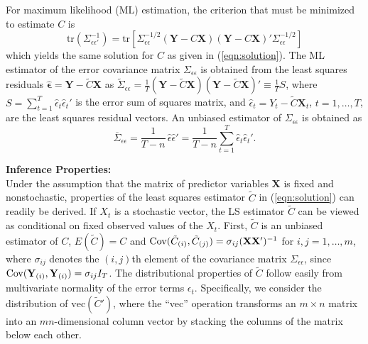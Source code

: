 For maximum likelihood (ML) estimation, the criterion that must be minimized to estimate $C$ is 
	\begin{equation}\label{eqn:mintrace}
	\text{tr}\left(\Sigma^{-1}_{\epsilon\epsilon'}\right)=\text{tr}\left[ \Sigma_{\epsilon\epsilon}^{-1/2} (\mathbf{Y}-C\mathbf{X})(\mathbf{Y}-C\mathbf{X})' \Sigma_{\epsilon\epsilon}^{-1/2}\right]
	\end{equation}
which yields the same solution for $C$ as given in (\ref{eqn:solution}). The ML estimator of the error covariance matrix $\Sigma_{\epsilon\epsilon}$ is obtained from the least squares residuals $\hat{\mathbf{\epsilon}}=\mathbf{Y}- \tilde{C} \mathbf{X}$ as $\tilde{\Sigma}_{\epsilon\epsilon}= \frac{1}{T}(\mathbf{Y}-\tilde{C}\mathbf{X})(\mathbf{Y}-\tilde{C}\mathbf{X})' \equiv \frac{1}{T}S$, where $S= \sum_{t=1}^T \hat{\epsilon}_t \hat{\epsilon}_t'$ is the error sum of squares matrix, and $\hat{\epsilon}_t= Y_t - \tilde{C} \mathbf{X}_t$, $t=1,\ldots,T$, are the least squares residual vectors. An unbiased estimator of $\Sigma_{\epsilon\epsilon}$ is obtained as 
	\begin{equation}\label{eqn:5unbiased}
	\overline{\Sigma}_{\epsilon\epsilon} = \dfrac{1}{T-n} \,\hat{\epsilon} \hat{\epsilon}' = \dfrac{1}{T-n} \sum_{t=1}^T \hat{\epsilon}_t \hat{\epsilon}_t'.
	\end{equation}


\noindent\textbf{Inference Properties:} \\


Under the assumption that the matrix of predictor variables $\mathbf{X}$ is fixed and nonstochastic, properties of the least squares estimator $\tilde{C}$ in (\ref{eqn:solution}) can readily be derived. If $X_t$ is a stochastic vector, the LS estimator $\tilde{C}$ can be viewed as conditional on fixed observed values of the $X_t$. First, $\tilde{C}$ is an unbiased estimator of $C$, $E(\tilde{C})=C$ and $\operatorname{Cov}(\tilde{C}_{(i)}, \tilde{C}_{(j)})=\sigma_{ij}(\mathbf{X}\mathbf{X}')^{-1}$ for $i,j=1,\ldots,m$, where $\sigma_{ij}$ denotes the $(i,j)$th element of the covariance matrix $\Sigma_{\epsilon\epsilon}$, since $\operatorname{Cov}(\mathbf{Y}_{(i)}, \mathbf{Y}_{(i)})=\sigma_{ij} I_T$. The distributional properties of $\tilde{C}$ follow easily from multivariate normality of the error terms $\epsilon_t$. Specifically, we consider the distribution of $\text{vec}(\tilde{C}')$, where the ``vec'' operation transforms an $m \times n$ matrix into an $mn$-dimensional column vector by stacking the columns of the matrix below each other. 



